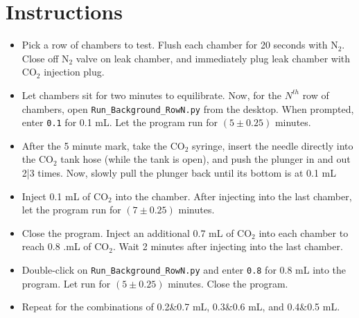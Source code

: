 \documentclass[letterpaper,12pt]{article}
\begin{document}
\section{Instructions}
\begin{itemize}
	\item Pick a row of chambers to test. Flush each chamber for 20 seconds with N$_2$. Close off N$_2$ valve on leak chamber, and immediately plug leak chamber with CO$_2$ injection plug.
	\item Let chambers sit for two minutes to equilibrate. Now, for the $N^{th}$ row of chambers, open \verb|Run_Background_RowN.py| from the desktop. When prompted, enter \verb|0.1| for 0.1 mL. Let the program run for $(5 \pm 0.25)$ minutes.
	\item After the 5 minute mark, take the CO$_2$ syringe, insert the needle directly into the CO$_2$ tank hose (while the tank is open), and push the plunger in and out 2|3 times. Now, slowly pull the plunger back until its bottom is at 0.1 mL
	
	\item Inject 0.1 mL of CO$_2$ into the chamber. After injecting into the last chamber, let the program run for $(7 \pm 0.25)$ minutes. 
	\item Close the program. Inject an additional 0.7 mL of CO$_2$ into each chamber to reach 0.8 .mL of CO$_2$. Wait 2 minutes after injecting into the last chamber.
	\item Double-click on \verb|Run_Background_RowN.py| and enter \verb|0.8| for 0.8 mL into the program. Let run for $(5 \pm 0.25)$ minutes. Close the program.
	\item Repeat for the combinations of 0.2\&0.7 mL, 0.3\&0.6 mL, and 0.4\&0.5 mL.
\end{itemize}
\end{document}
